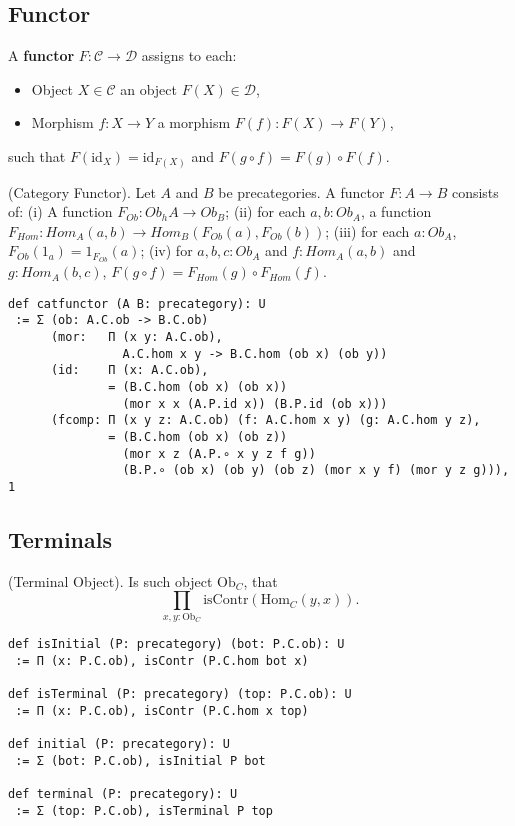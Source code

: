 \documentclass{article}
\begin{document}
\newpage
\subsection{Functor}

A \textbf{functor} $F: \mathcal{C} \to \mathcal{D}$ assigns to each:
\begin{itemize}
  \item Object $X \in \mathcal{C}$ an object $F(X) \in \mathcal{D}$,
  \item Morphism $f: X \to Y$ a morphism $F(f): F(X) \to F(Y)$,
\end{itemize}
such that $F(\mathrm{id}_X) = \mathrm{id}_{F(X)}$ and $F(g \circ f) = F(g) \circ F(f)$.


\begin{definition} (Category Functor).
Let $A$ and $B$ be precategories.
A functor $F : A \rightarrow B$ consists of: (i) A function $F_{Ob}: Ob_hA \rightarrow Ob_B$;
(ii) for each $a,b:Ob_A$, a function $F_{Hom}:Hom_A(a,b)\rightarrow Hom_B(F_{Ob}(a),F_{Ob}(b))$;
(iii) for each $a:Ob_A$, $F_{Ob}(1_a) = 1_{F_{Ob}}(a)$;
(iv) for $a,b,c:Ob_A$ and $f: Hom_A(a,b)$ and $g: Hom_A(b,c)$, $F(g\circ f) = F_{Hom}(g)\circ F_{Hom}(f)$.
\begin{lstlisting}
def catfunctor (A B: precategory): U
 := Σ (ob: A.C.ob -> B.C.ob)
      (mor:   Π (x y: A.C.ob),
                A.C.hom x y -> B.C.hom (ob x) (ob y))
      (id:    Π (x: A.C.ob),
              = (B.C.hom (ob x) (ob x))
                (mor x x (A.P.id x)) (B.P.id (ob x)))
      (fcomp: Π (x y z: A.C.ob) (f: A.C.hom x y) (g: A.C.hom y z),
              = (B.C.hom (ob x) (ob z))
                (mor x z (A.P.∘ x y z f g))
                (B.P.∘ (ob x) (ob y) (ob z) (mor x y f) (mor y z g))), 1

\end{lstlisting}
\end{definition}

\newpage
\subsection{Terminals}
\begin{definition} (Terminal Object). Is such object $\mathrm{Ob}_C$,
that
$$
    \prod_{x,y:\mathrm{Ob}_C} \mathrm{isContr} (\mathrm{Hom}_C(y,x)).
$$
\begin{lstlisting}
def isInitial (P: precategory) (bot: P.C.ob): U
 := Π (x: P.C.ob), isContr (P.C.hom bot x)

def isTerminal (P: precategory) (top: P.C.ob): U
 := Π (x: P.C.ob), isContr (P.C.hom x top)

def initial (P: precategory): U
 := Σ (bot: P.C.ob), isInitial P bot

def terminal (P: precategory): U
 := Σ (top: P.C.ob), isTerminal P top
\end{lstlisting}
\end{definition}
\end{document}
